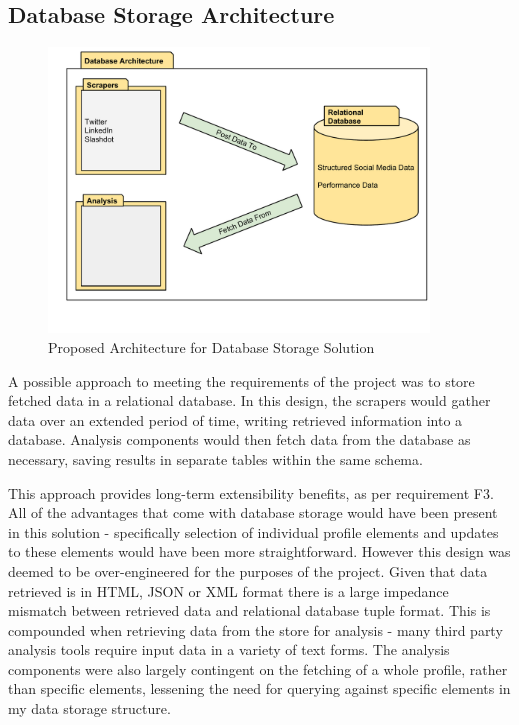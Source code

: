 

\subsection{Database Storage Architecture}

\begin{figure}[h!]
\begin{center} 
 \centering
  \includegraphics[width=0.9\textwidth]{Images/Database_Architecture.pdf}
 \caption{Proposed Architecture for Database Storage Solution}
\end{center}
 \end{figure}

A possible approach to meeting the requirements of the project was to store fetched data in a relational database. In this design, the scrapers would gather data over an extended period of time, writing retrieved information into a database. Analysis components would then fetch data from the database as necessary, saving results in separate tables within the same schema.

This approach provides long-term extensibility benefits, as per requirement F3. All of the advantages that come with database storage would have been present in this solution -
specifically selection of individual profile elements and updates to these elements would have been more straightforward. However this design was deemed to be over-engineered for the purposes of the project. Given that data retrieved is in HTML, JSON or XML format there is a large impedance mismatch between retrieved data and relational database tuple format. This is compounded when retrieving data from the store for analysis - many third party analysis tools require input data in a variety of text forms.  The analysis components were also largely contingent on the fetching of a whole profile, rather than specific elements, lessening the need for querying against specific elements in my data storage structure. 

